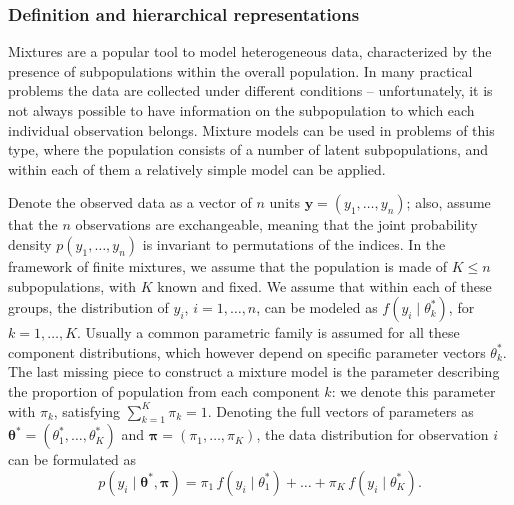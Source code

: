 \subsubsection*{Definition and hierarchical representations}
Mixtures are a popular tool to model heterogeneous data, characterized by the presence of subpopulations within the overall population. In many practical problems the data are collected under different conditions -- unfortunately, it is not always possible to have information on the subpopulation to which each individual observation belongs.
Mixture models can be used in problems of this type, where the population consists of a number of latent subpopulations, and within each of them a relatively simple model can be applied.

Denote the observed data as a vector of $n$ units $\bm{y} = (y_1,\dots,y_n)$; also, assume that the $n$ observations are exchangeable, meaning that the joint probability density $p(y_1,\dots,y_n)$ is invariant to permutations of the indices. In the framework of finite mixtures, we assume that the population is made of $K\leq n$ subpopulations, with $K$ known and fixed.
We assume that within each of these groups, the distribution of $y_i$, $i=1,\dots,n$, can be modeled as $f(y_i \mid \theta_k^*)$, for $k=1,\dots,K$. Usually a common parametric family is assumed for all these component distributions, which however depend on specific parameter vectors $\theta_k^*$.
The last missing piece to construct a mixture model is the parameter describing the proportion of population from each component $k$: we denote this parameter with $\pi_k$, satisfying $\sum_{k=1}^K \pi_k = 1$. Denoting the full vectors of parameters as $\bm{\theta}^* = (\theta_1^*,\dots,\theta_K^*)$ and $\bm{\pi} = (\pi_1,\dots,\pi_K)$, the data distribution for observation $i$ can be formulated as
\begin{equation*}
p(y_i\mid \bm{\theta}^*,\bm{\pi}) = \pi_1 \, f(y_i\mid\theta_1^*) + \dots + \pi_K \, f(y_i\mid\theta_K^*).
\end{equation*}

